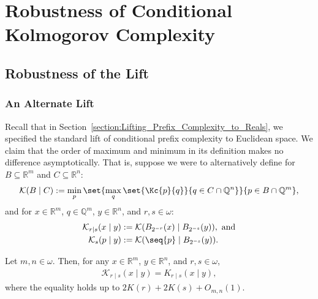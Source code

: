 \chapter{Robustness of Conditional Kolmogorov Complexity}\label{effective_dimension:robustness_conditional_complexity}

\section{Robustness of the Lift}

\label{section:Robustness_of_the_Lift}

\subsection{An Alternate Lift}

Recall that in Section~\ref{section:Lifting_Prefix_Complexity_to_Reals}, we specified the standard lift of conditional prefix complexity to Euclidean space. We claim that the order of maximum and minimum in its definition makes no difference asymptotically. That is, suppose we were to alternatively define for $B \subseteq \mathbb{R}^m$ and $C \subseteq \mathbb{R}^n$:
\begin{align*} 
    \mathcal{K}(B \mid C) := \min_p \set{\max_q \set{\Kc{p}{q}}{q \in C \cap \mathbb{Q}^n}}{p \in B \cap \mathbb{Q}^m},
\end{align*}
and for $x \in \mathbb{R}^m$, $q \in \mathbb{Q}^m$, $y \in \mathbb{R}^n$, and $r, s \in \omega$:
\begin{align*}
    \mathcal{K}_{r \mid s}(x \mid y) &:= \mathcal{K}(B_{2^{-r}}(x) \mid B_{2^{-s}}(y)), \text{ and}\\
    \mathcal{K}_s(p \mid y) &:= \mathcal{K}(\seq{p} \mid B_{2^{-s}}(y)).
\end{align*}

\begin{theorem}
    \label{theorem:maxmin_and_minmax_conditional_complexity_equal}
    Let $m, n \in \omega$. Then, for any $x \in \mathbb{R}^m$, $y \in \mathbb{R}^n$, and $r, s \in \omega$,
    \begin{align*}
        \mathcal{K}_{r \mid s}(x \mid y) = K_{r \mid s}(x \mid y),
    \end{align*}
    where the equality holds up to $2K(r) + 2K(s) + O_{m, n}(1)$.
\end{theorem}

